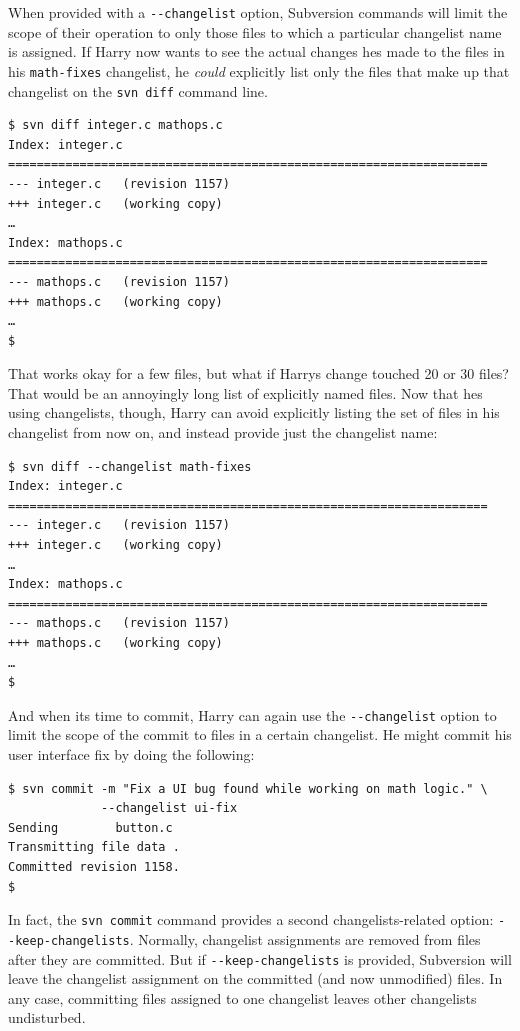 When provided with a \texttt{-\/-changelist} option, Subversion commands
will limit the scope of their operation to only those files to which a
particular changelist name is assigned. If Harry now wants to see the
actual changes he\textquotesingle s made to the files in his
\texttt{math-fixes} changelist, he \emph{could} explicitly list only the
files that make up that changelist on the \texttt{svn\ diff} command
line.

\begin{verbatim}
$ svn diff integer.c mathops.c
Index: integer.c
===================================================================
--- integer.c   (revision 1157)
+++ integer.c   (working copy)
…
Index: mathops.c
===================================================================
--- mathops.c   (revision 1157)
+++ mathops.c   (working copy)
…
$
\end{verbatim}

That works okay for a few files, but what if Harry\textquotesingle s
change touched 20 or 30 files? That would be an annoyingly long list of
explicitly named files. Now that he\textquotesingle s using changelists,
though, Harry can avoid explicitly listing the set of files in his
changelist from now on, and instead provide just the changelist name:

\begin{verbatim}
$ svn diff --changelist math-fixes
Index: integer.c
===================================================================
--- integer.c   (revision 1157)
+++ integer.c   (working copy)
…
Index: mathops.c
===================================================================
--- mathops.c   (revision 1157)
+++ mathops.c   (working copy)
…
$
\end{verbatim}

And when it\textquotesingle s time to commit, Harry can again use the
\texttt{-\/-changelist} option to limit the scope of the commit to files
in a certain changelist. He might commit his user interface fix by doing
the following:

\begin{verbatim}
$ svn commit -m "Fix a UI bug found while working on math logic." \
             --changelist ui-fix
Sending        button.c
Transmitting file data .
Committed revision 1158.
$
\end{verbatim}

In fact, the \texttt{svn\ commit} command provides a second
changelists-related option: \texttt{-\/-keep-changelists}. Normally,
changelist assignments are removed from files after they are committed.
But if \texttt{-\/-keep-changelists} is provided, Subversion will leave
the changelist assignment on the committed (and now unmodified) files.
In any case, committing files assigned to one changelist leaves other
changelists undisturbed.

